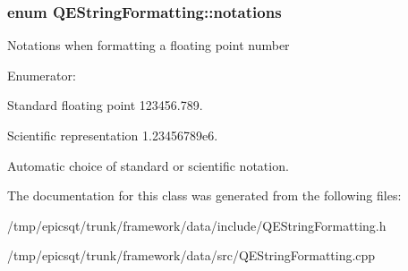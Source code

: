 \hypertarget{classQEStringFormatting_adfa7fa261e196d1327d4da6e046dbd84}{
\subsubsection[{notations}]{\setlength{\rightskip}{0pt plus 5cm}enum {\bf QEStringFormatting::notations}}}
\label{classQEStringFormatting_adfa7fa261e196d1327d4da6e046dbd84}
Notations when formatting a floating point number \begin{Desc}
\item[Enumerator: ]\par
\begin{description}
\item[{\em 
\hypertarget{classQEStringFormatting_adfa7fa261e196d1327d4da6e046dbd84aff4a04845bd3039833cd1cf7f91a8c89}{
NOTATION\_\-FIXED}
\label{classQEStringFormatting_adfa7fa261e196d1327d4da6e046dbd84aff4a04845bd3039833cd1cf7f91a8c89}
}]Standard floating point 123456.789. \item[{\em 
\hypertarget{classQEStringFormatting_adfa7fa261e196d1327d4da6e046dbd84a79198d28f4a318e4c9e7334e6beec56b}{
NOTATION\_\-SCIENTIFIC}
\label{classQEStringFormatting_adfa7fa261e196d1327d4da6e046dbd84a79198d28f4a318e4c9e7334e6beec56b}
}]Scientific representation 1.23456789e6. \item[{\em 
\hypertarget{classQEStringFormatting_adfa7fa261e196d1327d4da6e046dbd84ab8061ebe09c1cacc3f83dc66869c21cd}{
NOTATION\_\-AUTOMATIC}
\label{classQEStringFormatting_adfa7fa261e196d1327d4da6e046dbd84ab8061ebe09c1cacc3f83dc66869c21cd}
}]Automatic choice of standard or scientific notation. \end{description}
\end{Desc}



The documentation for this class was generated from the following files:\begin{DoxyCompactItemize}
\item 
/tmp/epicsqt/trunk/framework/data/include/QEStringFormatting.h\item 
/tmp/epicsqt/trunk/framework/data/src/QEStringFormatting.cpp\end{DoxyCompactItemize}
